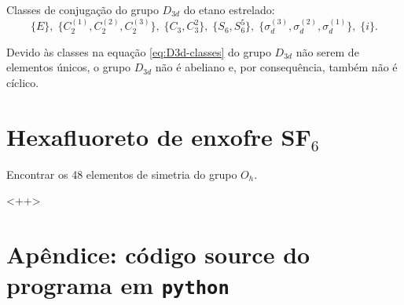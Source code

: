 \documentclass[a4paper,10pt]{article}
\newcommand{\python}[1]{\texttt{#1}}
\begin{document}
Classes de conjugação do grupo $D_{3d}$ do etano estrelado:
\begin{equation} \label{eq:D3d-classes}
\boxed{
\{ E \}, \;
\{ C_2^{(1)}, C_2^{(2)}, C_2^{(3)} \}, \;
\{ C_3, C_3^2 \}, \;
\{ S_6, S_6^5 \}, \;
\{ \sigma_d^{(3)}, \sigma_d^{(2)}, \sigma_d^{(1)} \}, \;
\{ i \}.
}
\end{equation}

Devido às classes na equação \ref{eq:D3d-classes} do grupo $D_{3d}$ não serem de elementos únicos, o grupo $D_{3d}$ não é abeliano e, por consequência, também não é cíclico.

\pagebreak

\section*{Hexafluoreto de enxofre SF$_6$}

Encontrar os 48 elementos de simetria do grupo $O_h$.

<++>

\pagebreak

\section*{Apêndice: código source do programa em \python{python}} \label{sec:apendice}
\end{document}
